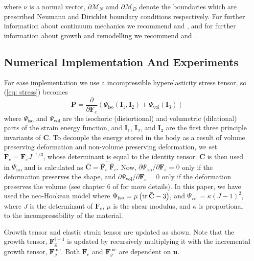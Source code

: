 where $\nu$ is a normal vector, $\partial\mathcal{M}_N$ amd $\partial\mathcal{M}_D$ denote the boundaries which are prescribed Neumann and Dirichlet boundary conditions respectively. For further information about continuum mechanics we recommend \citep{Marsden1983} and \citep{Holzapfel2002}, and for further information about growth and remodelling we recommend \citep{Goriely2017} and \citep{Yavari2010}.

\subsection{Numerical Implementation And Experiments}
For ease implementation we use a  incompressible hyperelasticity stress tensor, so (\ref{eq: stress}) becomes
\begin{equation*}
    \mathbf{P} = \frac{\partial }{\partial \mathbf{F}_e}(\Psi_\text{iso}(\mathbf{I}_1, \mathbf{I}_2) + \Psi_\text{vol}(\mathbf{I}_3))
\end{equation*}
where $\Psi_\text{iso}$ and $\Psi_\text{vol}$ are the isochoric (distortional) and volumetric (dilational) parts of the strain energy function, and $\mathbf{I}_1$, $\mathbf{I}_2$, and $\mathbf{I}_3$ are the first three principle invariants of $\mathbf{C}$. To decouple the energy stored in the body as a result of volume preserving deformation and non-volume preserving deformation, we set $\mathbf{\bar{F}}_e = \mathbf{F}_eJ^{-1/3}$, whose determinant is equal to the identity tensor. $\mathbf{\bar{C}}$ is then used in $\Psi_\text{iso}$ and is calculated as $\mathbf{\bar{C}} = \mathbf{\bar{F}}_e^\top \mathbf{\bar{F}}_e$. Now, $\partial\Psi_\text{iso}/\partial \mathbf{F}_e = 0$ only if the deformation preserves the shape, and $\partial\Psi_\text{vol}/\partial \mathbf{F}_e = 0$ only if the deformation preserves the volume (see chapter 6 of \citep{Holzapfel2002} for more details). In this paper, we have used the neo-Hookean model where $\Psi_\text{iso} = \mu\left(\tr\mathbf{\bar{C}} - 3\right)$, and $\Psi_\text{vol} = \kappa(J-1)^2$, where $J$ is the determinant of $\mathbf{F}_e$, $\mu$ is the shear modulus, and $\kappa$ is proportional to the incompressibility of the material. \par 
{}
\begin{algorithm} 
    \caption{Growth tensor and elastic strain tensor are updated as shown. Note that the growth tensor, $\mathbf{F}_\mathrm{g}^{i + 1}$ is updated by recursively multiplying it with the incremental growth tensor, $\mathbf{F}_g^\mathrm{inc}$. Both $\mathbf{F}_\mathrm{e}$ and $\mathbf{F}_g^\mathrm{inc}$ are dependent on $\mathbf{u}$.}\label{alg:growth_deform}
    \SetAlgoLined
\end{algorithm} 
